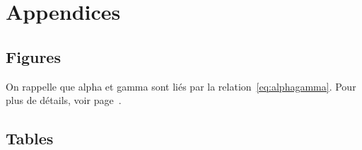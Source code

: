 \chapter{Appendices}



\section{Figures}
	\blindtext
	On rappelle que \gls{alpha} et \gls{gamma} sont liés par la relation~\eqref{eq:alphagamma}. Pour plus de détails, voir page~\pageref{eq:alphagamma}.

\section{Tables}
	\blindtext

